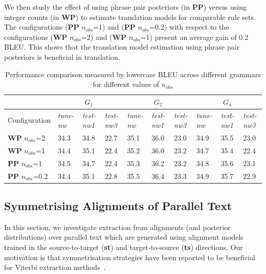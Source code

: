 We then study the effect of using phrase pair posteriors (in {\bf PP}) versus
using integer counts (in {\bf WP}) to estimate translation models for comparable
rule sets. The configurations ({\bf PP} $n_{obs}$=1) and
({\bf PP} $n_{obs}$=0.2) with respect to the configurations
({\bf WP} $n_{obs}$=2) and ({\bf WP} $n_{obs}$=1) present an average gain of
0.2 BLEU. This shows that the translation model estimation using phrase pair
posteriors is beneficial in translation.

\begin{table}
  \begin{small}
  \centering
  \begin{tabular}{*{10}{|l}|}
    \hline
    &  &  &  \\
    \hline
    Configuration & {\em tune-nw} & {\em test-nw1} & {\em test-nw3} & {\em tune-nw} & {\em test-nw1} & {\em test-nw3} & {\em tune-nw} & {\em test-nw1} & {\em test-nw3} \\
    \hline
        {\bf WP} $n_{obs}$=2 & 34.3 & 34.8  & 22.7 & 35.1 & 36.0 & 23.0 & 34.9 & 35.5 & 23.0 \\
        \hline
            {\bf WP} $n_{obs}$=1 & 34.4 & 35.1 & 22.4 & 35.2 & 36.0 & 23.2 & 34.7 & 35.4 & 22.4 \\
            \hline
                {\bf PP} $n_{obs}$=1 & 34.5 &  34.7 & 22.4 & 35.3 & 36.2 & 23.2 & 34.8 & 35.6 & 23.1 \\
                \hline
                    {\bf PP} $n_{obs}$=0.2 & 34.4 & 35.1 & 22.8 & 35.5 & 36.4 & 23.3 & 34.9 & 35.7 & 22.9 \\
                    \hline
  \end{tabular}
  \end{small}
  \caption{Performance comparison measured by lowercase BLEU  across different grammars for different values of $n_{obs}$}
  \label{tab:nocc}
\end{table}

\subsection{Symmetrising Alignments of Parallel Text}
\label{sec:extractionFromPosteriorsSymmetrising}

In this section, we investigate extraction from alignments (and posterior
distributions) over parallel text which are generated using alignment models
trained in the source-to-target ({\bf st}) and target-to-source ({\bf ts})
directions. Our motivation is that symmetrisation strategies have been reported
to be beneficial for Viterbi extraction
methods~\citep{koehn-och-marcu:2003:NAACL}. 

